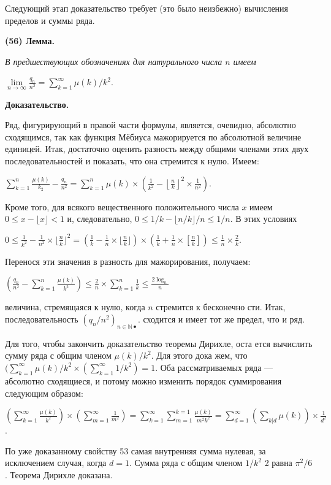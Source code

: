 \documentclass{mai_book}
\begin{document}
Следующий этап доказательство требует (это было неизбежно) вычисления пределов и суммы ряда.

\textbf{(56) Лемма.}

\textit{В предшествующих обозначениях для натурального числа $n$ имеем}
\begin{center}
$\lim\limits_{n\to\infty}\frac{q_{n}}{n^2}=\sum\limits_{k=1}^{\infty}\mu(k)/k^2$.
\end{center}
\textbf{Доказательство.}

Ряд, фигурирующий в правой части формулы, является, очевидно,
абсолютно сходящимся, так как функция Мёбиуса мажорируется по
абсолютной величине единицей. Итак, достаточно оценить разность
между общими членами этих двух последовательностей и показать,
что она стремится к нулю. Имеем:
\newpage
\begin{center}
$\sum\limits_{k=1}^{n}\frac{\mu(k)}{k_{2}}-\frac{q_{n}}{n^2}=\sum\limits_{k=1}^n\mu(k)\times \left(\frac{1}{k^2}-\left\lfloor\frac{n}{k}\right\rfloor^2\times\frac{1}{n^2}\right)$.
\end{center}
Кроме того, для всякого вещественного положительного числа $x$
имеем $0\leqslant x-\lfloor x\rfloor <1$ и, следовательно, $0\leqslant 1/k-\lfloor n/k\rfloor/n\leqslant 1/n$. В
этих условиях
\begin{center}
$0\leqslant\frac{1}{k^2}-\frac{1}{n^2}\times\lfloor\frac{n}{k}\rfloor^2=\left(\frac{1}{k}-\frac{1}{n}\times\lfloor\frac{n}{k}\rfloor\right)\times\left(\frac{1}{k}+\frac{1}{n}\times\left[\frac{n}{k}\right]\right)\leqslant\frac{1}{n}\times\frac{2}{k}$.
\end{center}
Перенося эти значения в разность для мажорирования, получаем:
\begin{center}
$\left(\frac{q_{n}}{n^2}-\sum\limits_{k=1}^{n}\frac{\mu(k)}{k^2}\right)\leqslant\frac{2}{n}\times\sum\limits_{k=1}^{n}\frac{1}{k}\leqslant\frac{2\log_n}{n}$
\end{center}
величина, стремящаяся к нулю, когда $n$ стремится к бесконечно­
сти. Итак, последовательность $(q_{n}/n^2)_{n\in\mathbb{N•}}$. сходится и имеет тот же предел, что и ряд.

Для того, чтобы закончить доказательство теоремы Дирихле, оста­
ется вычислить сумму ряда с общим членом $\mu(k)/k^2$. Для этого дока­
жем, что $(\sum\nolimits_{k=1}^{\infty}\mu(k)/k^2\times(\sum\nolimits_{k=1}^{\infty}1/k^2)=1$.
Оба рассматриваемых ряда — абсолютно сходящиеся, и потому можно изменить порядок суммирования следующим образом:
\begin{center}
$\left(\sum\limits_{k=1}^{\infty}\frac{\mu(k)}{k^2}\right)\times\left(\sum\limits_{m=1}^{\infty}\frac{1}{m^2}\right)=\sum\limits_{k=1}^{\infty}\sum\limits_{m=1}^{k=1}\frac{\mu(k)}{m^2 k^2}=\sum\limits_{d=1}^{\infty}\left(\sum\limits_{k|d}\mu(k)\right)\times\frac{1}{d^2}$.
\end{center}
По уже доказанному свойству 53 самая внутренняя сумма нулевая, за
исключением случая, когда $d=1$. Сумма ряда с общим членом $1/k^2$ 2
равна $\pi^2/6$. Теорема Дирихле доказана.
\end{document}
